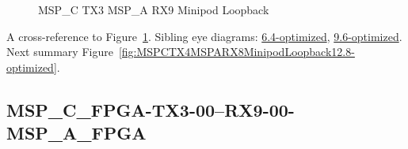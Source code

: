 \begin{figure}[h]
\begin{subfigure}{0.33\textwidth}
\hyperref[sec:MSPCFPGATX306RX906MSPAFPGA12.8-optimized]{}
\end{subfigure}\hspace*{\fill}
\begin{subfigure}{0.33\textwidth}
\hyperref[sec:MSPCFPGATX307RX907MSPAFPGA12.8-optimized]{}
\end{subfigure}\hspace*{\fill}
\begin{subfigure}{0.33\textwidth}
\hyperref[sec:MSPCFPGATX308RX908MSPAFPGA12.8-optimized]{}
\end{subfigure}

\begin{subfigure}{0.33\textwidth}
\hyperref[sec:MSPCFPGATX309RX909MSPAFPGA12.8-optimized]{}
\end{subfigure}\hspace*{\fill}
\begin{subfigure}{0.33\textwidth}
\hyperref[sec:MSPCFPGATX310RX910MSPAFPGA12.8-optimized]{}
\end{subfigure}\hspace*{\fill}
\begin{subfigure}{0.33\textwidth}
\hyperref[sec:MSPCFPGATX311RX911MSPAFPGA12.8-optimized]{}
\end{subfigure}

\caption{MSP\_C TX3 MSP\_A RX9 Minipod Loopback} \label{fig:MSPCTX3MSPARX9MinipodLoopback12.8-optimized}
\end{figure}

A cross-reference to Figure~\ref{fig:MSPCTX3MSPARX9MinipodLoopback12.8-optimized}.
Sibling eye diagrams: \hyperref[sec:MSPCTX3MSPARX9MinipodLoopback6.4-optimized]{6.4-optimized}, \hyperref[sec:MSPCTX3MSPARX9MinipodLoopback9.6-optimized]{9.6-optimized}. \\
Next summary Figure~\ref{fig:MSPCTX4MSPARX8MinipodLoopback12.8-optimized}.
\clearpage
% 
\subsection{MSP\_C\_FPGA-TX3-00--RX9-00-MSP\_A\_FPGA}\label{sec:MSPCFPGATX300RX900MSPAFPGA12.8-optimized}

